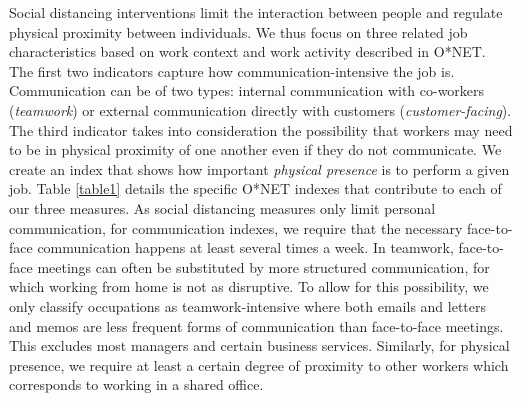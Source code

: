 Social distancing interventions limit the interaction between people and regulate physical proximity between individuals. We thus focus on three related job characteristics based on work context and work activity described in O*NET. The first two indicators capture how communication-intensive the job is. Communication can be of two types: internal communication with co-workers (\emph{teamwork}) or external communication directly with customers (\emph{customer-facing}). The third indicator takes into consideration the possibility that workers may need to be in physical proximity of one another even if they do not communicate. We create an index that shows how important \emph{physical presence} is to perform a given job. Table \ref{table1} details the specific O*NET indexes that contribute to each of our three measures.
As social distancing measures only limit personal communication, for communication indexes, we require that the necessary face-to-face communication happens at least several times a week. 
In teamwork, face-to-face meetings can often be substituted by more structured communication, for which working from home is not as disruptive. To allow for this possibility, we only classify occupations as teamwork-intensive where both emails and letters and memos are less frequent forms of communication than face-to-face meetings. This excludes most managers and certain business services. Similarly, for physical presence, we require at least a certain degree of proximity to other workers which corresponds to working in a shared office.

